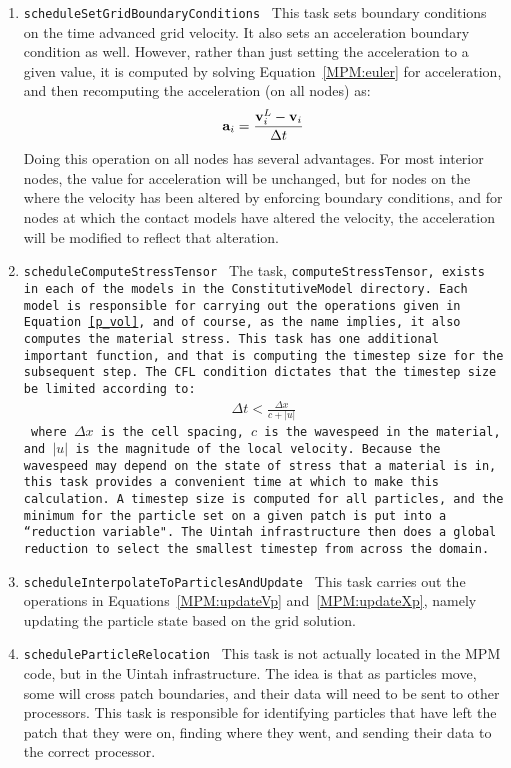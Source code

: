 \begin{enumerate}
\item {\tt scheduleSetGridBoundaryConditions \normalfont}  This task sets boundary conditions
on the time advanced grid velocity.  It also sets an acceleration boundary
condition as well.  However, rather than just setting the acceleration
to a given value, it is computed by solving Equation~\ref{MPM:euler} for
acceleration, and then recomputing the acceleration (on all nodes) as:
\begin{eqnarray}
\bfa_i= \frac{\bfv^L_i - \bfv_i}{\Delta{t}}
\label{MPM:accBC}
\end{eqnarray}
Doing this operation on all nodes has several advantages.  For most interior
nodes, the value for acceleration will be unchanged, but for nodes on the 
where the velocity has been altered by enforcing boundary conditions, and
for nodes at which the contact models have altered the velocity, the acceleration
will be modified to reflect that alteration.

\item{\tt scheduleComputeStressTensor \normalfont}  The task, \tt computeStressTensor, \normalfont
exists in each of the models in the \tt ConstitutiveModel \normalfont directory.  Each
model is responsible for carrying out the operations given in
Equation~\ref{p_vol}, and of course, as the name implies, it also computes
the material stress.  This task has one additional important function,
and that is computing the timestep size for the subsequent step.  The CFL
condition dictates that the timestep size be limited according to:
\begin{eqnarray}
\Delta{t} < \frac{\Delta{x}}{c+|u|}
\label{MPM:CFL}
\end{eqnarray}
where $\Delta{x}$ is the cell spacing, $c$ is the wavespeed in the material,
and $|u|$ is the magnitude of the local velocity.  Because the wavespeed 
may depend on the state of stress that a material is in, this task provides
a convenient time at which to make this calculation.  A timestep size is
computed for all particles, and the minimum for the particle set on a given
patch is put into a ``reduction variable".  The Uintah infrastructure then
does a global reduction to select the smallest timestep from across the
domain.

\item {\tt scheduleInterpolateToParticlesAndUpdate \normalfont}  This task carries out the
operations in Equations~\ref{MPM:updateVp} and~\ref{MPM:updateXp}, namely updating
the particle state based on the grid solution.

\item {\tt scheduleParticleRelocation \normalfont}  This task is not actually located
in the MPM code, but in the Uintah infrastructure.  The idea is that as particles
move, some will cross patch boundaries, and their data will need to be sent to
other processors.  This task is responsible for identifying particles that have
left the patch that they were on, finding where they went, and sending their
data to the correct processor.

\end{enumerate}

